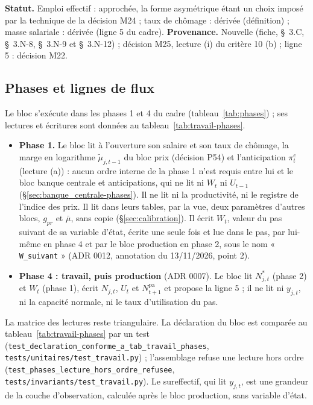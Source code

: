 \documentclass[11pt,a4paper]{article}
\begin{document}
\textbf{Statut.} Emploi effectif : approchée, la forme asymétrique étant un choix imposé par la technique de la décision M24 ; taux de chômage : dérivée (définition) ; masse salariale : dérivée (ligne 5 du cadre). \textbf{Provenance.} Nouvelle (fiche, \S~3.C, \S~3.N-8, \S~3.N-9 et \S~3.N-12) ; décision M25, lecture (i) du critère 10 (b) ; ligne 5 : décision M22.

\subsection{Phases et lignes de flux}
\label{sec:travail-phases}
Le bloc s'exécute dans les phases 1 et 4 du cadre (tableau~\ref{tab:phases}) ; ses lectures et écritures sont données au tableau~\ref{tab:travail-phases}.
\begin{itemize}
\item \textbf{Phase 1.} Le bloc lit à l'ouverture son salaire et son taux de chômage, la marge en logarithme $\tilde\mu_{j,t-1}$ du bloc prix (décision P54) et l'anticipation $\pi^e_t$ (lecture (a)) : aucun ordre interne de la phase 1 n'est requis entre lui et le bloc banque centrale et anticipations, qui ne lit ni $W_t$ ni $U_{t-1}$ (\S\ref{sec:banque_centrale-phases}). Il ne lit ni la productivité, ni le registre de l'indice des prix. Il lit dans leurs tables, par la vue, deux paramètres d'autres blocs, $g_{\mathit{pr}}$ et $\bar\mu$, sans copie (\S\ref{sec:calibration}). Il écrit $W_t$, valeur du pas suivant de sa variable d'état, écrite une seule fois et lue dans le pas, par lui-même en phase 4 et par le bloc production en phase 2, sous le nom « \texttt{W\_suivant} » (ADR 0012, annotation du 13/11/2026, point 2).
\item \textbf{Phase 4 : travail, puis production} (ADR 0007). Le bloc lit $N^{\ast}_{j,t}$ (phase 2) et $W_t$ (phase 1), écrit $N_{j,t}$, $U_t$ et $N^{\mathrm{pa}}_{t+1}$ et propose la ligne 5 ; il ne lit ni $y_{j,t}$, ni la capacité normale, ni le taux d'utilisation du pas.
\end{itemize}
{\setlength{\emergencystretch}{3em}La matrice des lectures reste triangulaire. La déclaration du bloc est comparée au tableau~\ref{tab:travail-phases} par un test (\nolinkurl{test_declaration_conforme_a_tab_travail_phases}, \nolinkurl{tests/unitaires/test_travail.py}) ; l'assemblage refuse une lecture hors ordre (\nolinkurl{test_phases_lecture_hors_ordre_refusee}, \nolinkurl{tests/invariants/test_travail.py}). Le sureffectif, qui lit $y_{j,t}$, est une grandeur de la couche d'observation, calculée après le bloc production, sans variable d'état.\par}
\end{document}
